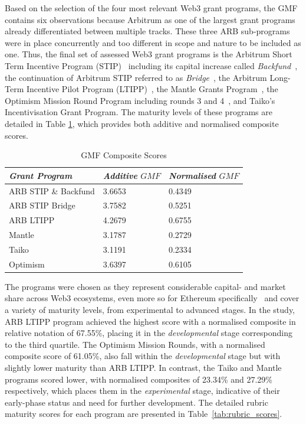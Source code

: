 \documentclass[conference]{IEEEtran}
\begin{document}
Based on the selection of the four most relevant Web3 grant programs, the GMF contains six observations because Arbitrum as one of the largest grant programs already differentiated between multiple tracks. These three ARB sub-programs were in place concurrently and too different in scope and nature to be included as one. Thus, the final set of assessed Web3 grant programs is the Arbitrum Short Term Incentive Program (STIP)~\cite{tnorm_arbitrums_2023,arbitrum_dao_arbitrum_2023} including its capital increase called \textit{Backfund}~\cite{frisson_arbitrum_2023}, the continuation of Arbitrum STIP referred to as \textit{Bridge}~\cite{lumley_stip-bridge_2024,arbitrum_dao_double-down_2024}, the Arbitrum Long-Term Incentive Pilot Program (LTIPP)~\cite{stein_arbitrum_2024}, the Mantle Grants Program~\cite{bitdao_passed_2023}, the Optimism Mission Round Program including rounds 3 and 4~\cite{the_optimism_collective_what_2024}, and Taiko's Incentivisation Grant Program. The maturity levels of these programs are detailed in Table \ref{tab:gmf_composite_score}, which provides both additive and normalised composite scores.

\begin{table}[htbp]
\caption{GMF Composite Scores}
\centering
\footnotesize
\begin{tabular}{p{2.7cm}p{2cm}p{2.3cm}}
\hline
\textbf{\textit{Grant Program}} & \textbf{\textit{Additive} \( GMF\)} & \textbf{\textit{Normalised} \( GMF \)} \\
\hline
ARB STIP \& Backfund & 3.6653 & 0.4349 \\
ARB STIP Bridge & 3.7582 & 0.5251 \\
ARB LTIPP & 4.2679 & 0.6755 \\
Mantle & 3.1787 & 0.2729 \\
Taiko & 3.1191 & 0.2334 \\
Optimism & 3.6397 & 0.6105 \\
\hline
\end{tabular}
\label{tab:gmf_composite_score}
\end{table}

The programs were chosen as they represent considerable capital- and market share across Web3 ecosystems, even more so for Ethereum specifically~\cite{marz_airdrops_2024} and cover a variety of maturity levels, from experimental to advanced stages. In the study, ARB LTIPP program achieved the highest score with a normalised composite in relative notation of 67.55\%, placing it in the \textit{developmental} stage corresponding to the third quartile. The Optimism Mission Rounds, with a normalised composite score of 61.05\%, also fall within the \textit{developmental} stage but with slightly lower maturity than ARB LTIPP. In contrast, the Taiko and Mantle programs scored lower, with normalised composites of 23.34\% and 27.29\% respectively, which places them in the \textit{experimental} stage, indicative of their early-phase status and need for further development. The detailed rubric maturity scores for each program are presented in Table~\ref{tab:rubric_scores}.
\end{document}
